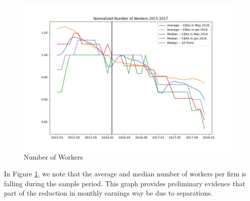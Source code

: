 \documentclass[12pt]{article}
\begin{document}
		\begin{figure}[!ht]
			\centering
			\caption{Number of Workers}
			\label{fig:NormEmp}
			\includegraphics[scale = .65]{tables-figures/normalized_avg_med_emp_2015_2017.png}
		\end{figure}

		In Figure \ref{fig:NormEmp}, we note that the average and median number of workers per firm is falling during the sample period. This graph provides preliminary evidence that part of the reduction in monthly earnings way be due to separations. 
\end{document}
